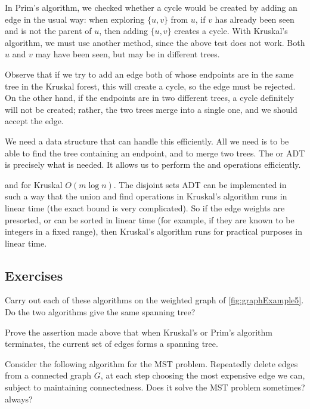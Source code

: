 In Prim's algorithm, we checked whether a cycle would be created by adding
an edge in the usual way: when exploring $\{u, v\}$ from $u$, if $v$ has
already been seen and is not the parent of $u$, then adding $\{u, v\}$
creates a cycle. With Kruskal's algorithm, we must use another method,
since the above test does not work. Both $u$ and $v$ may have been seen,
but may be in different trees.

Observe that if we try to add an edge both of whose endpoints are in
the same tree in the Kruskal forest, this will create a cycle, so the
edge must be rejected. On the other hand, if the endpoints are in two
different trees, a cycle definitely will not be created; rather, the two
trees merge into a single one, and we should accept the edge. 

We need a data structure that can handle this efficiently. All we need is to be
able to find the tree containing an endpoint, and to merge two trees. The
 or  ADT is precisely what
is needed. It allows us to perform the  and 
operations efficiently. %




 and for Kruskal $O(m \log n)$. The disjoint sets
ADT can be implemented in such a way that the union and find operations
in Kruskal's algorithm runs in  linear time (the exact bound
is very complicated). So if the edge weights are presorted, or can be
sorted in linear time (for example, if they are known to be integers in
a fixed range), then Kruskal's algorithm runs for practical purposes in
linear time.

\subsection*{Exercises}

\begin{Exercise} \label{ex:doMST}
Carry out each of these algorithms on the weighted
graph of \cref{fig:graphExample5}. Do the two algorithms give the
same spanning tree? 
\end{Exercise}

\begin{Exercise} \label{ex:spanning-tree}
Prove the assertion made above that when Kruskal's or Prim's algorithm 
terminates, the current set of edges forms a spanning tree.
\end{Exercise}

\begin{Exercise}\label{ex:silly-MST}
Consider the following algorithm for the MST problem. Repeatedly delete
edges from a connected graph $G$, at each step choosing the most
expensive edge we can, subject to maintaining connectedness. Does it
solve the MST problem sometimes? always?
\end{Exercise}


